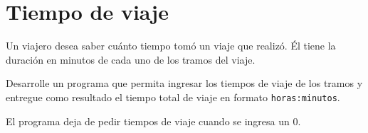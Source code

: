 \section{Tiempo de viaje}

Un viajero desea saber cuánto tiempo tomó un viaje que realizó. Él tiene
la duración en minutos de cada uno de los tramos del viaje.

Desarrolle un programa que permita ingresar los tiempos de viaje de los
tramos y entregue como resultado el tiempo total de viaje en formato
\lstinline!horas:minutos!.

El programa deja de pedir tiempos de viaje cuando se ingresa un 0.
